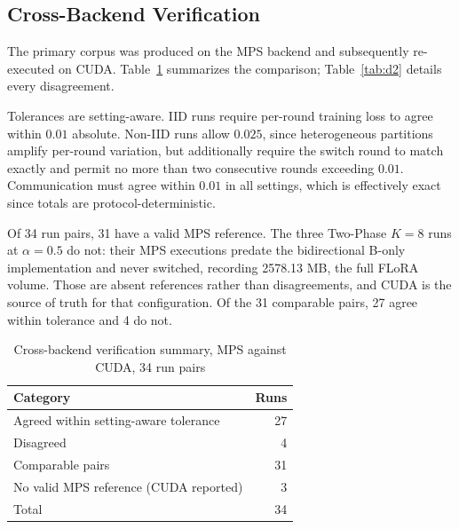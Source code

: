 \documentclass[iicol,pdflatex,sn-mathphys-num]{sn-jnl}
\begin{document}
\begin{appendices}
\section{Cross-Backend Verification}
\label{app:crossbackend}

The primary corpus was produced on the MPS backend and subsequently re-executed on CUDA. Table~\ref{tab:d1} summarizes the comparison; Table~\ref{tab:d2} details every disagreement.

Tolerances are setting-aware. IID runs require per-round training loss to agree within $0.01$ absolute. Non-IID runs allow $0.025$, since heterogeneous partitions amplify per-round variation, but additionally require the switch round to match exactly and permit no more than two consecutive rounds exceeding $0.01$. Communication must agree within $0.01$ in all settings, which is effectively exact since totals are protocol-deterministic.

Of 34 run pairs, 31 have a valid MPS reference. The three Two-Phase $K{=}8$ runs at $\alpha{=}0.5$ do not: their MPS executions predate the bidirectional B-only implementation and never switched, recording 2578.13 MB, the full FLoRA volume. Those are absent references rather than disagreements, and CUDA is the source of truth for that configuration. Of the 31 comparable pairs, 27 agree within tolerance and 4 do not.

\begin{table}[tbp]
\centering
\footnotesize
\renewcommand{\arraystretch}{0.88}
\setlength{\tabcolsep}{6pt}
\caption{Cross-backend verification summary, MPS against CUDA, 34 run pairs}
\label{tab:d1}
\begin{tabular}{@{}lr@{}}
\toprule
Category & Runs \\
\midrule
Agreed within setting-aware tolerance & 27 \\
Disagreed & 4 \\
\midrule
Comparable pairs & 31 \\
No valid MPS reference (CUDA reported) & 3 \\
\midrule
Total & 34 \\
\bottomrule
\end{tabular}
\end{table}


\end{appendices}
\end{document}
